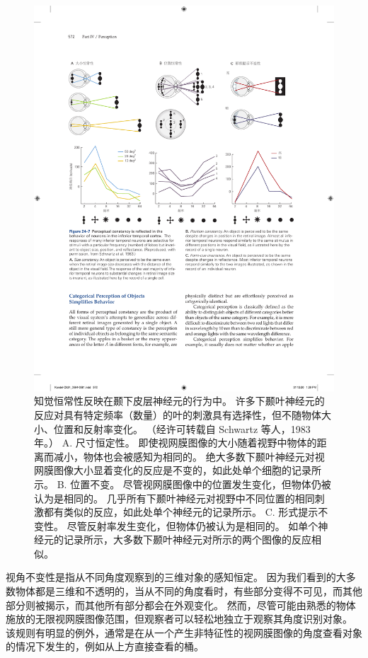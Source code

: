 \begin{figure}[htbp]
	\centering
	\includegraphics[width=0.9\linewidth]{chap24/fig_24_7}
	\caption{知觉恒常性反映在颞下皮层神经元的行为中。 许多下颞叶神经元的反应对具有特定频率（数量）的叶的刺激具有选择性，但不随物体大小、位置和反射率变化。 （经许可转载自 Schwartz 等人，1983 年。） A. 尺寸恒定性。 即使视网膜图像的大小随着视野中物体的距离而减小，物体也会被感知为相同的。 绝大多数下颞叶神经元对视网膜图像大小显着变化的反应是不变的，如此处单个细胞的记录所示。 B. 位置不变。 尽管视网膜图像中的位置发生变化，但物体仍被认为是相同的。 几乎所有下颞叶神经元对视野中不同位置的相同刺激都有类似的反应，如此处单个神经元的记录所示。 C. 形式提示不变性。 尽管反射率发生变化，但物体仍被认为是相同的。 如单个神经元的记录所示，大多数下颞叶神经元对所示的两个图像的反应相似。}
	\label{fig:24_7}
\end{figure}


视角不变性是指从不同角度观察到的三维对象的感知恒定。
因为我们看到的大多数物体都是三维和不透明的，当从不同的角度看时，有些部分变得不可见，而其他部分则被揭示，而其他所有部分都会在外观变化。
然而，尽管可能由熟悉的物体施放的无限视网膜图像范围，但观察者可以轻松地独立于观察其角度识别对象。
该规则有明显的例外，通常是在从一个产生非特征性的视网膜图像的角度查看对象的情况下发生的，例如从上方直接查看的桶。


